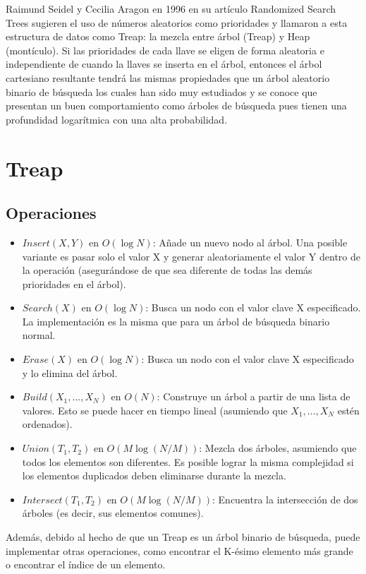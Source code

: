\documentclass[12pt]{article}
\newcommand{\ct}{árbol cartesiano }
\begin{document}
Raimund Seidel y Cecilia Aragon en 1996 en su artículo Randomized Search Trees sugieren el uso de números aleatorios como prioridades y llamaron a esta estructura de datos como Treap: la mezcla entre árbol (Treap) y Heap (montículo). Si las prioridades de cada llave se eligen de forma aleatoria e independiente de cuando la llaves se inserta en el árbol, entonces el \ct resultante tendrá las mismas propiedades que un árbol aleatorio binario de búsqueda los cuales han sido muy estudiados y se conoce que presentan un buen comportamiento como árboles de búsqueda pues tienen una profundidad logarítmica con una alta probabilidad.

\section{Treap}

\subsection{Operaciones}

\begin{itemize}
	\item $Insert(X, Y)$ en $O(\log N)$: Añade un nuevo nodo al árbol. Una posible variante es pasar solo el valor X y generar aleatoriamente el valor Y dentro de la operación (asegurándose de que sea diferente de todas las demás prioridades en el árbol).
	\item $Search(X)$ en $O(\log N)$: Busca un nodo con el valor clave X especificado. La implementación es la misma que para un árbol de búsqueda binario normal.
	\item $Erase(X)$ en $O(\log N)$: Busca un nodo con el valor clave X especificado y lo elimina del árbol.
	\item $Build(X_1, ..., X_N)$ en $O(N)$: Construye un árbol a partir de una lista de valores. Esto se puede hacer en tiempo lineal (asumiendo que $X_1, ..., X_N$ estén ordenados).
	\item $Union(T_1, T_2)$ en $O(M \log (N / M))$: Mezcla dos árboles, asumiendo que todos los elementos son diferentes. Es posible lograr la misma complejidad si los elementos duplicados deben eliminarse durante la mezcla.
	\item $Intersect(T_1, T_2)$ en $O(M \log (N / M))$: Encuentra la intersección de dos árboles (es decir, sus elementos comunes).
\end{itemize}

Además, debido al hecho de que un Treap es un árbol binario de búsqueda, puede implementar otras operaciones, como encontrar el K-ésimo elemento más grande o encontrar el índice de un elemento.
\end{document}
